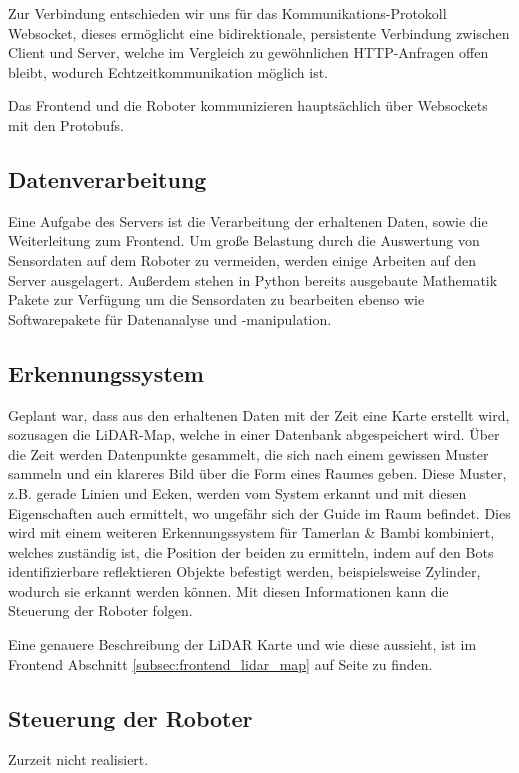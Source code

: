Zur Verbindung entschieden wir uns für das Kommunikations-Protokoll Websocket, 
dieses ermöglicht eine bidirektionale, 
persistente Verbindung zwischen Client und Server,
welche im Vergleich zu gewöhnlichen HTTP-Anfragen offen bleibt, 
wodurch Echtzeitkommunikation möglich ist.

Das Frontend und die Roboter kommunizieren hauptsächlich 
über Websockets mit den Protobufs.

\subsection{Datenverarbeitung}
Eine Aufgabe des Servers ist die Verarbeitung der erhaltenen Daten, 
sowie die Weiterleitung zum Frontend.
% 
Um große Belastung durch die Auswertung von Sensordaten auf dem Roboter zu vermeiden, 
werden einige Arbeiten auf den Server ausgelagert.
Außerdem stehen in Python bereits ausgebaute Mathematik Pakete zur Verfügung 
um die Sensordaten zu bearbeiten 
ebenso wie Softwarepakete für Datenanalyse und -manipulation.


\subsection{Erkennungssystem}
Geplant war, dass aus den erhaltenen Daten mit der Zeit eine Karte erstellt wird, 
sozusagen die LiDAR-Map, 
welche in einer Datenbank abgespeichert wird.
% 
Über die Zeit werden Datenpunkte gesammelt, 
die sich nach einem gewissen Muster sammeln 
und ein klareres Bild über die Form eines Raumes geben.
Diese Muster, z.B. gerade Linien und Ecken, werden vom System erkannt 
und mit diesen Eigenschaften auch ermittelt, 
wo ungefähr sich der Guide im Raum befindet.
% 
Dies wird mit einem weiteren Erkennungssystem für Tamerlan \& Bambi kombiniert, 
welches zuständig ist, die Position der beiden zu ermitteln,
indem auf den Bots identifizierbare reflektieren Objekte befestigt werden, 
beispielsweise Zylinder, wodurch sie erkannt werden können.
%
Mit diesen Informationen kann die Steuerung der Roboter folgen.

Eine genauere Beschreibung der LiDAR Karte und wie diese aussieht, 
ist im Frontend Abschnitt \ref{subsec:frontend_lidar_map} 
auf Seite \pageref{subsec:frontend_lidar_map} zu finden.

\subsection{Steuerung der Roboter}
\label{subsec:backend_robot_detection}
Zurzeit nicht realisiert.

